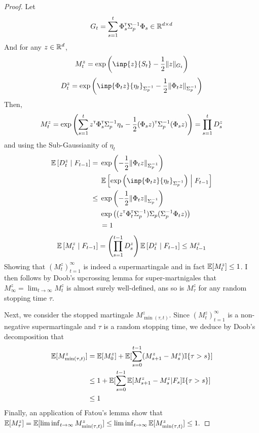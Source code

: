 \documentclass{article}
\begin{document}
\begin{proof}


Let 
\begin{equation*}
    G_t = \sum_{s=1}^t \Phi_s^{\mathsf{\scriptscriptstyle T}} \Sigma_p^{-1} \Phi_s \in \mathbb{R}^{d\times d}
\end{equation*}
And for any $z\in\mathbb{R}^d$,
\begin{equation*}
    M_t^z = \exp{\left(\inp{z}{S_t} - \frac{1}{2}\|z\|_{G_t}\right)}
\end{equation*}
\begin{equation*}
    D_t^z = \exp{\left(\inp{\Phi_t z}{\eta_t}_{\Sigma_p^{-1}} - \frac{1}{2}\|\Phi_t z\|_{\Sigma_p^{-1}}\right)}
\end{equation*}
Then,
\begin{align*}
    M_t^z = \exp{\left(\sum_{s=1}^t z^{\mathsf{\scriptscriptstyle T}}\Phi_s^{\mathsf{\scriptscriptstyle T}}\Sigma_p^{-1} \eta_s - \frac{1}{2} (\Phi_s z)^{\mathsf{\scriptscriptstyle T}}\Sigma_p^{-1}(\Phi_s z) \right)} = \prod_{s=1}^{t} D_s^z
\end{align*}
and using the Sub-Gaussianity of $\eta_t$
\begin{align*}
    \expectedvalue\left[D_t^z \condbar F_{t-1}\right] = {}& \exp{\left(- \frac{1}{2}\|\Phi_t z\|_{\Sigma_p^{-1}}\right)}\\ &\expectedvalue\left[\exp{\left(\inp{\Phi_t z}{\eta_t}_{\Sigma_p^{-1}}\right)} \condbar F_{t-1}\right]  \\
    \leq {} & \exp{\left(- \frac{1}{2}\|\Phi_t z\|_{\Sigma_p^{-1}}\right)}\\
    &\exp{\left((z^\transp \Phi_t^\transp \Sigma_p^{-1})\Sigma_p(\Sigma_p^{-1} \Phi_t z)\right)}\\
    &= 1
\end{align*}
\begin{align*}
    \operatorname*{\mathbb{E}}\left[M_t^z \;\middle|\; F_{t-1}\right] = \left(\prod_{s=1}^{t-1} D_s^z\right) \operatorname*{\mathbb{E}}\left[D_t^z \;\middle|\; F_{t-1}\right] \leq M_{t-1}^z
\end{align*}
Showing that $(M_t^z)_{t=1}^\infty$ is indeed a supermartingale and in fact $\operatorname*{\mathbb{E}}[M_t^z]\leq 1$.
I then follows by Doob's upcrossing lemma for super-martnigales that $M_\infty^z = \lim_{t\to\infty} M_t^z$ is almost surely well-defined, ans so is $M_\tau^z$ for any random stopping time $\tau$.

Next, we consider the stopped martingale $M_{\min(\tau,t)}^z$. Since 
$(M_t^z)_{t=1}^\infty$ is a non-negative supermartingale and $\tau$ is a random stopping time, we deduce by Doob's decomposition that
\begin{align*}
\operatorname*{\mathbb{E}}[M_{\min(\tau,t)}^z] &= \operatorname*{\mathbb{E}}[M_0^z] + \operatorname*{\mathbb{E}}[\sum_{s=0}^{t-1} (M_{s+1}^z-M_s^z) \mathbb{I}\{\tau>s\}]\\
&\leq 1 + \operatorname*{\mathbb{E}}[\sum_{s=0}^{t-1} \operatorname*{\mathbb{E}}[M_{s+1}^z-M_s^z|F_{s}] \mathbb{I}\{\tau>s\}]\\
&\leq 1
\end{align*}
Finally, an application of Fatou's lemma show that 
$\operatorname*{\mathbb{E}}[M_\tau^z] = \operatorname*{\mathbb{E}}[\liminf_{t\to\infty} M_{\min(\tau,t)}^z] \leq \liminf_{t\to\infty} \operatorname*{\mathbb{E}}[M_{\min(\tau,t)}^z] \leq 1.$


\end{proof}
\end{document}
